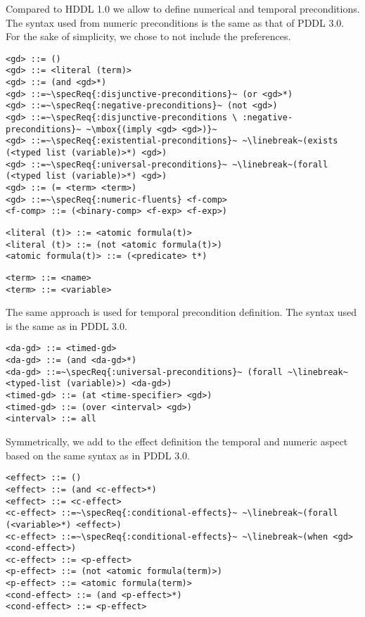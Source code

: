 \documentclass{article}
\begin{document}
%
% 
\noindent Compared to HDDL 1.0 we allow to define numerical and temporal preconditions. The syntax used from numeric preconditions is the same as that of PDDL 3.0. For the sake of simplicity, we chose to not include the preferences. 
\begin{lstlisting}[firstnumber=last, escapechar=~]
<gd> ::= ()
<gd> ::= <literal (term)>
<gd> ::= (and <gd>*)
<gd> ::=~\specReq{:disjunctive-preconditions}~ (or <gd>*)
<gd> ::=~\specReq{:negative-preconditions}~ (not <gd>)
<gd> ::=~\specReq{:disjunctive-preconditions \ :negative-preconditions}~ ~\mbox{(imply <gd> <gd>)}~
<gd> ::=~\specReq{:existential-preconditions}~ ~\linebreak~(exists (<typed list (variable)>*) <gd>)
<gd> ::=~\specReq{:universal-preconditions}~ ~\linebreak~(forall (<typed list (variable)>*) <gd>)
<gd> ::= (= <term> <term>)
<gd> ::=~\specReq{:numeric-fluents} <f-comp>
<f-comp> ::= (<binary-comp> <f-exp> <f-exp>)
\end{lstlisting}

\begin{lstlisting}[firstnumber=last, escapechar=~]
<literal (t)> ::= <atomic formula(t)>
<literal (t)> ::= (not <atomic formula(t)>)
<atomic formula(t)> ::= (<predicate> t*)
\end{lstlisting}

\begin{lstlisting}[firstnumber=last, escapechar=~]
<term> ::= <name>
<term> ::= <variable>
\end{lstlisting}

%
% 

\noindent The same approach is used for temporal precondition definition. The syntax used is the same as in PDDL 3.0. 

\begin{lstlisting}[firstnumber=last, escapechar=~]
<da-gd> ::= <timed-gd>
<da-gd> ::= (and <da-gd>*)
<da-gd> ::=~\specReq{:universal-preconditions}~ (forall ~\linebreak~ <typed-list (variable)>) <da-gd>)
<timed-gd> ::= (at <time-specifier> <gd>)
<timed-gd> ::= (over <interval> <gd>)
<interval> ::= all
\end{lstlisting}

%
% 
\noindent Symmetrically, we add to the effect definition the temporal and numeric aspect based on the same syntax as in PDDL 3.0.

\begin{lstlisting}[firstnumber=last, escapechar=~]
<effect> ::= ()
<effect> ::= (and <c-effect>*)
<effect> ::= <c-effect>
<c-effect> ::=~\specReq{:conditional-effects}~ ~\linebreak~(forall (<variable>*) <effect>)
<c-effect> ::=~\specReq{:conditional-effects}~ ~\linebreak~(when <gd> <cond-effect>)
<c-effect> ::= <p-effect>
<p-effect> ::= (not <atomic formula(term)>)
<p-effect> ::= <atomic formula(term)>
<cond-effect> ::= (and <p-effect>*)
<cond-effect> ::= <p-effect>
\end{lstlisting}
\end{document}
